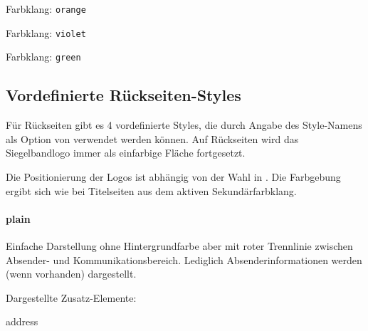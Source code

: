 \begin{minipage}{0.33\textwidth}\centering
  Farbklang: \texttt{orange}\\
\end{minipage}
\begin{minipage}{0.33\textwidth}\centering
  Farbklang: \texttt{violet}\\
\end{minipage}
\begin{minipage}{0.33\textwidth}\centering
  Farbklang: \texttt{green}\\
\end{minipage}

\subsection{Vordefinierte Rückseiten-Styles}\label{sec:backstyles}

Für Rückseiten gibt es 4 vordefinierte Styles, die durch Angabe des
Style-Namens als Option von  verwendet werden können.
Auf Rückseiten wird das Siegelbandlogo immer als einfarbige Fläche fortgesetzt.

Die Positionierung der Logos ist abhängig von der Wahl in .
Die Farbgebung ergibt sich wie bei Titelseiten aus dem aktiven Sekundärfarbklang.

  \begin{minipage}[t]{0.33\textwidth}
    \null\centering\sffamily
  \end{minipage}%
  \hfill
  \begin{minipage}[t]{0.6\textwidth}
    \paragraph{plain}
    \par
    Einfache Darstellung ohne Hintergrundfarbe aber mit
    roter Trennlinie zwischen Absender- und Kommunikationsbereich.
    Lediglich Absenderinformationen werden (wenn vorhanden) dargestellt.
    \par\bigskip
    \par\bigskip
    Dargestellte Zusatz-Elemente:
    \begin{compactitem}\ttfamily
      \item address
    \end{compactitem}
  \end{minipage}

